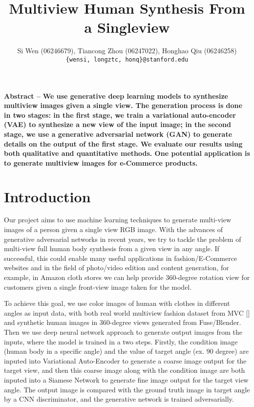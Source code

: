 \documentclass[10pt,conference]{IEEEtran}
\title{Multiview Human Synthesis From a Singleview}
\author{Si Wen (06246679), Tiancong Zhou (06247022), Honghao Qiu (06246258)\\
\texttt{\{wensi, longztc, honq\}{@}stanford.edu}}
\begin{document}
\maketitle

\newcommand{\R}{\mathbb{R}}
\newcommand{\eqnset}[1]{\left.\mbox{$#1$}\quad\quad\right\rbrace}
\newcommand{\tr}{\text{tr}\;}
\renewcommand{\th}{\theta}
\newcommand{\toi}{^{(i)}}


\textbf{Abstract --  }
\textbf{We use generative deep learning models to synthesize multiview images given a single view. The generation process is done in two stages: in the first stage, we train a variational auto-encoder (VAE) to synthesize a new view of the input image; in the second stage, we use a generative adversarial network (GAN) to generate details on the output of the first stage. We evaluate our results using both qualitative and quantitative methods. One potential application is to generate multiview images for e-Commerce products.}


\section{Introduction} 
Our project aims to use machine learning techniques to generate multi-view images of a person given a single view RGB image. With the advances of generative adversarial networks in recent years, we try to tackle the problem of multi-view full human body synthesis from a given view in any angle. If successful, this could enable many useful applications in fashion/E-Commerce websites and in the field of photo/video edition and content generation, for example, in Amazon cloth stores we can help provide 360-degree rotation view for customers given a single front-view image taken for the model. 

To achieve this goal, we use color images of human with clothes in different angles as input data, with both real world multiview fashion dataset from MVC [] and synthetic human images in 360-degree views generated from Fuse/Blender. Then we use deep neural network approach to generate output images from the inputs, where the model is trained in a two steps. Firstly, the condition image (human body in a specific angle) and the value of target angle (ex. 90 degree) are inputed into Variational Auto-Encoder to generate a coarse image output for the target view, and then this coarse image along with the condition image are both inputed into a Siamese Network to generate fine image output for the target view angle. The output image is compared with the ground truth image in target angle by a CNN discriminator, and the generative network is trained adversarially. 
\end{document}
